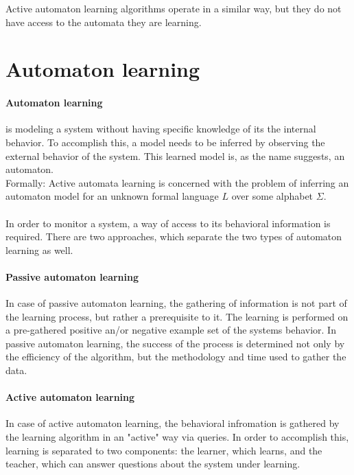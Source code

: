 Active automaton learning algorithms operate in a similar way, but they do not have access to the automata they are learning.



\section{Automaton learning}



\paragraph{Automaton learning}  is modeling a system without having specific knowledge of its the internal behavior. To accomplish this, a model needs to be inferred by observing the external behavior of the system. This learned model is, as the name suggests, an automaton. 
\\Formally: Active  automata  learning is  concerned  with  the  problem  of  inferring  an automaton model for an unknown formal language $L$ over some alphabet $\Sigma$\cite{Howar2018}.
\\\\In order to monitor a system, a way of access to its behavioral information is required. There are two approaches, which separate the two types of automaton learning as well.

\paragraph{Passive automaton learning} In case of passive automaton learning, the gathering of information is not part of the learning process, but rather a prerequisite to it. The learning is performed on a pre-gathered positive an/or negative example set of the systems behavior. In passive automaton learning, the success of the process is determined not only by the efficiency of the algorithm, but the methodology and time used to gather the data.

\paragraph{Active automaton learning} In case of active automaton learning, the behavioral infromation is gathered by the learning algorithm in an "active" way via queries. In order to accomplish this, learning is separated to two components: the learner, which learns, and the teacher, which can answer questions about the system under learning.


